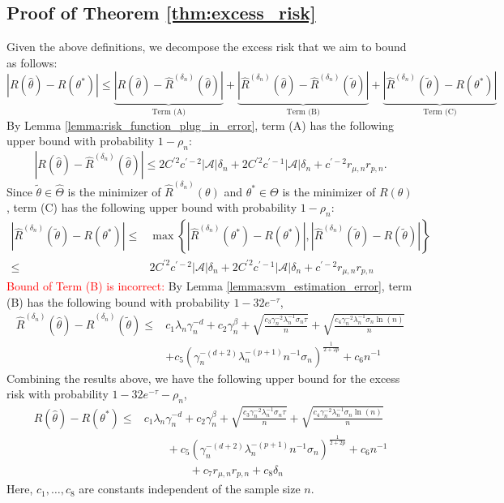 \subsection{Proof of Theorem \ref{thm:excess_risk}}
Given the above definitions, we decompose the excess risk that we aim to bound as follows:
\begin{equation}\label{eq:excess_risk_decomposition}
   |R(\widehat\theta)-R\left(\theta^*\right)|\leq \underbrace{|R(\widehat\theta)-\widehat R^{({\delta_n})}(\widehat\theta)|}_{\text{Term (A)}} + \underbrace{|\widehat R^{({\delta_n})}(\widehat\theta) - \widehat R^{({\delta_n})}(\tilde\theta)|}_{\text{Term (B)}} + \underbrace{|\widehat R^{({\delta_n})}(\tilde\theta) - R(\theta^*)|}_{\text{Term (C)}} 
\end{equation}
By Lemma \ref{lemma:risk_function_plug_in_error}, term (A) has the following upper bound with probability $1-\rho_n$:
$$|R(\widehat\theta)-\widehat R^{({\delta_n})}(\widehat\theta)|\leq 2C^{\prime2}c^{\prime-2}|\mathcal{A}|\delta_n +2C^{\prime2}c^{\prime-1}|\mathcal{A}|\delta_n + c^{\prime-2}r_{\mu,n}r_{p,n}. $$
Since $\tilde\theta\in \widehat \Theta$ is the minimizer of $\widehat R^{({\delta_n})}(\theta)$ and $\theta^*\in \Theta$ is the minimizer of $R(\theta)$, term (C) has the following upper bound with probability $1-\rho_n$:
\begin{align*}
    |\widehat R^{({\delta_n})}(\tilde\theta) - R(\theta^*)|\leq &\max\left\{|\widehat R^{({\delta_n})}(\theta^*) - R(\theta^*)|,|\widehat R^{({\delta_n})}(\tilde\theta) - R(\tilde\theta)|\right\} \\
    \leq &2C^{\prime2}c^{\prime-2}|\mathcal{A}|\delta_n +2C^{\prime2}c^{\prime-1}|\mathcal{A}|\delta_n + c^{\prime-2}r_{\mu,n}r_{p,n}
\end{align*}
\textcolor{red}{Bound of Term (B) is incorrect: }
By Lemma \ref{lemma:svm_estimation_error}, term (B) has the following bound with probability $1-32e^{-\tau}$,
\begin{align*}
   \widehat R^{({\delta_n})}(\widehat\theta) - \widehat R^{({\delta_n})}(\tilde\theta)\leq & c_1 \lambda_n\gamma_n^{-d} + c_2\gamma_n^{\beta}+ \sqrt{\frac{ c_3\gamma_n^{-2}\lambda_n^{-1}\sigma_n\tau}{n}} + \sqrt{\frac{ c_4\gamma_n^{-2}\lambda_n^{-1}\sigma_n\ln(n)}{n}} \\
   & + c_5\left(\gamma_n^{-(d+2)}\lambda_n^{-(p+1)}n^{-1}\sigma_n\right)^{\frac{1}{2+2p}} + c_6n^{-1}
\end{align*}
Combining the results above, we have the following upper bound for the excess risk with probability $1-32e^{-\tau} - \rho_n$,
\begin{align*}
       R(\widehat\theta)-R\left(\theta^*\right)\leq & c_1 \lambda_n\gamma_n^{-d} + c_2\gamma_n^{\beta}+ \sqrt{\frac{ c_3\gamma_n^{-2}\lambda_n^{-1}\sigma_n\tau}{n}} + \sqrt{\frac{ c_4\gamma_n^{-2}\lambda_n^{-1}\sigma_n\ln(n)}{n}} \\
   & \qquad + c_5\left(\gamma_n^{-(d+2)}\lambda_n^{-(p+1)}n^{-1}\sigma_n\right)^{\frac{1}{2+2p}} + c_6n^{-1}\\
       & \qquad\qquad + c_7r_{\mu,n}r_{p,n} + c_8{\delta_n}
    \end{align*}
Here, $c_1,\ldots,c_8$ are constants independent of the sample size $n$.

